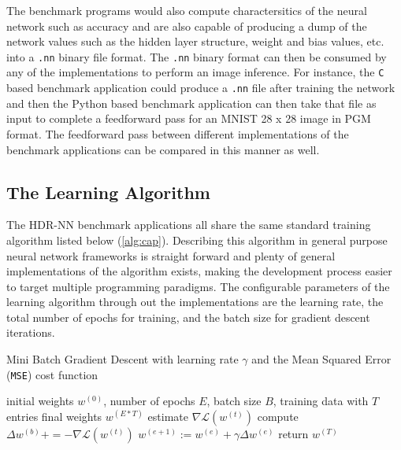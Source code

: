 The benchmark programs would also compute charactersitics of the neural network such as accuracy and are also capable of producing a dump of the network values such as the hidden layer structure, weight and bias values, etc. into a \texttt{.nn} binary file format. The \texttt{.nn} binary format can then be consumed by any of the implementations to perform an image inference. For instance, the \texttt{C} based benchmark application could produce a \texttt{.nn} file after training the network and then the Python based benchmark application can then take that file as input to complete a feedforward pass for an MNIST 28 x 28 image in PGM format. The feedforward pass between different implementations of the benchmark applications can be compared in this manner as well.

\subsection[HDR-NN Training]{The Learning Algorithm}

The HDR-NN benchmark applications all share the same standard training algorithm listed below (\ref{alg:cap}). Describing this algorithm in general purpose neural network frameworks is straight forward and plenty of general implementations of the algorithm exists, making the development process easier to target multiple programming paradigms. The configurable parameters of the learning algorithm through out the implementations are the learning rate, the total number of epochs for training, and the batch size for gradient descent iterations.

\begin{algorithm}[h]
	\caption{Mini Batch Gradient Descent with learning rate $\gamma$ and the Mean Squared Error (\texttt{MSE}) cost function}
	\label{alg:cap}
	\begin{algorithmic}
	\Require initial weights $w^{(0)}$, number of epochs $E$, batch size $B$, training data with $T$ entries
	\Ensure final weights $w^{(E*T)}$
			\State estimate $\nabla \mathcal{L}(w^{(t)})$ 
			\State compute $\Delta w^{(b)} += - \nabla \mathcal{L}(w^{(t)})$\label{lin:deep-learning-delta-w}
			\EndFor
			\State $w^{(e + 1)} := w^{(e)} + \gamma \Delta w^{(e)}$
		\EndFor
	\EndFor
	\State return $w^{(T)}$
	\end{algorithmic}
\end{algorithm}

